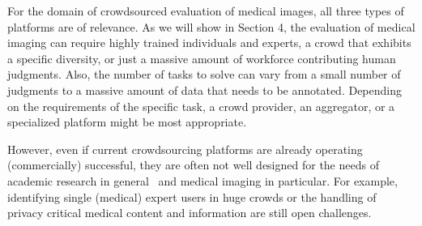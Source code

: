 \documentclass[10pt,twocolumn,letterpaper]{article}
\begin{document}
For the domain of crowdsourced evaluation of medical images, all three types of platforms are of relevance. As we will show in Section 4, the evaluation of medical imaging can require highly trained individuals and experts, a crowd that exhibits a specific diversity, or just a massive amount of workforce contributing human judgments. Also, the number of tasks to solve can vary from a small number of judgments to a massive amount of data that needs to be annotated. Depending on the requirements of the specific task, a crowd provider, an aggregator, or a specialized platform might be most appropriate. 

However, even if current crowdsourcing platforms are already operating (commercially) successful, they are often not well designed for the needs of academic research in general~\cite{hirth2017crowdsourcing} and medical imaging in particular. For example, identifying single (medical) expert users in huge crowds or the handling of privacy critical medical content and information are still open challenges. %

 
 
\end{document}
